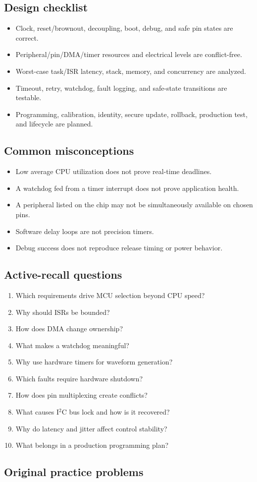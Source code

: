 \documentclass[10pt,letterpaper]{article}
\begin{document}
\subsection{Design checklist}
\begin{itemize}
  \item Clock, reset/brownout, decoupling, boot, debug, and safe pin states are correct.
  \item Peripheral/pin/DMA/timer resources and electrical levels are conflict-free.
  \item Worst-case task/ISR latency, stack, memory, and concurrency are analyzed.
  \item Timeout, retry, watchdog, fault logging, and safe-state transitions are testable.
  \item Programming, calibration, identity, secure update, rollback, production test, and lifecycle are planned.
\end{itemize}\subsection{Common misconceptions}
\begin{itemize}
  \item Low average CPU utilization does not prove real-time deadlines.
  \item A watchdog fed from a timer interrupt does not prove application health.
  \item A peripheral listed on the chip may not be simultaneously available on chosen pins.
  \item Software delay loops are not precision timers.
  \item Debug success does not reproduce release timing or power behavior.
\end{itemize}\subsection{Active-recall questions}
\begin{enumerate}
  \item Which requirements drive MCU selection beyond CPU speed?
  \item Why should ISRs be bounded?
  \item How does DMA change ownership?
  \item What makes a watchdog meaningful?
  \item Why use hardware timers for waveform generation?
  \item Which faults require hardware shutdown?
  \item How does pin multiplexing create conflicts?
  \item What causes I$^2$C bus lock and how is it recovered?
  \item Why do latency and jitter affect control stability?
  \item What belongs in a production programming plan?
\end{enumerate}\subsection{Original practice problems}
\end{document}
